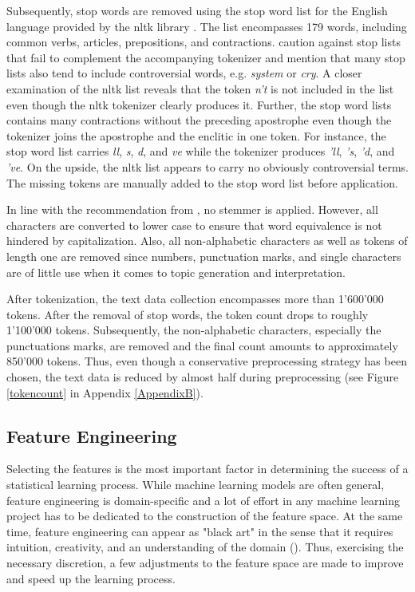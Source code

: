 \documentclass[11pt,a4paper,english,oneside]{book}
\numberwithin{equation}{chapter}
\begin{document}
Subsequently, stop words are removed using the stop word list for the English language provided by the nltk library \citep{Bird.2010}. The list encompasses 179 words, including common verbs, articles, prepositions, and contractions. \citet[pp. 8--9]{Nothman.2018} caution against stop lists that fail to complement the accompanying tokenizer and mention that many stop lists also tend to include controversial words, e.g. \textit{system} or \textit{cry}. A closer examination of the nltk list reveals that the token \textit{n't} is not included in the list even though the nltk tokenizer clearly produces it. Further, the stop word lists contains many contractions without the preceding apostrophe even though the tokenizer joins the apostrophe and the enclitic in one token. For instance, the stop word list carries \textit{ll}, \textit{s}, \textit{d}, and \textit{ve} while the tokenizer produces \textit{'ll}, \textit{'s}, \textit{'d}, and \textit{'ve}. On the upside, the nltk list appears to carry no obviously controversial terms. The missing tokens are manually added to the stop word list before application. 

In line with the recommendation from \cite{Schofield.2017}, no stemmer is applied. However, all characters are converted to lower case to ensure that word equivalence is not hindered by capitalization. Also, all non-alphabetic characters as well as tokens of length one are removed since numbers, punctuation marks, and single characters are of little use when it comes to topic generation and interpretation. 

After tokenization, the text data collection encompasses more than 1'600'000 tokens. After the removal of stop words, the token count drops to roughly 1'100'000 tokens. Subsequently, the non-alphabetic characters, especially the punctuations marks, are removed and the final count amounts to approximately 850'000 tokens. Thus, even though a conservative preprocessing strategy has been chosen, the text data is reduced by almost half during preprocessing (see Figure \ref{tokencount} in Appendix \ref{AppendixB}).

\subsection{Feature Engineering}\label{featueeng}
Selecting the features is the most important factor in determining the success of a statistical learning process. While machine learning models are often general, feature engineering is domain-specific and a lot of effort in any machine learning project has to be dedicated to the construction of the feature space. At the same time, feature engineering can appear as "black art" in the sense that it requires intuition, creativity, and an understanding of the domain (\citealp{Domingos.2012}). Thus, exercising the necessary discretion, a few adjustments to the feature space are made to improve and speed up the learning process. 
\end{document}
